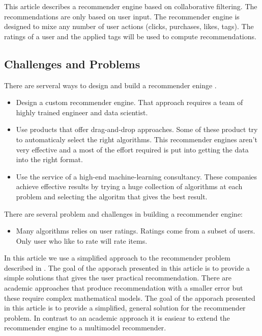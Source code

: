 This article describes a recommender engine based on collaborative filtering. The recommendations are only based on user input. The recommender engine is designed to mixe any number of user actions (clicks, purchases, likes, tags). The ratings of a user and the applied tags will be used to compute recommendations.

\subsection{Challenges and Problems}

There are serveral ways to design and build a recommender eninge \cite{Dunning14}.

\begin{itemize}
\item Design a custom recommender engine. That approach requires a team of highly trained engineer and data scientist.
\item Use products that offer drag-and-drop approaches. Some of these product try to automaticaly select the right algorithms. This recommender engines aren't very effective and a most of the effort required is put into getting the data into the right format.
\item Use the service of a high-end machine-learning consultancy. These companies achieve effective results by trying a huge collection of algorithms at each problem and selecting the algoritm that gives the best result.
\end{itemize}

There are several problem and challenges in building a recommender engine:
\begin{itemize}
\item Many algorithms relies on user ratings. Ratings come from a subset of users. Only user who like to rate will rate items. 
\end{itemize}

In this article we use a simplified approach to the recommender problem described in \cite{Dunning14}. The goal of the apporach presented in this article is to provide a simple solutions that gives the user practical recommendation. There are academic approaches that produce recommendation with a smaller error but these require complex mathematical models. The goal of the apporach presented in this article is to provide a simplified, general solution for the recommender problem. In contrast to an academic approach it is easiear to extend the recommender engine to a multimodel recommender.


